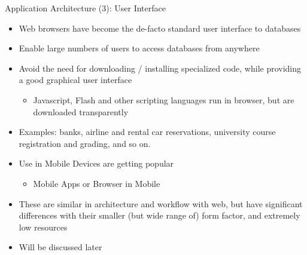 \documentclass[aspectratio=169, xcolor=dvipsnames]{beamer}
\begin{document}
\begin{frame}{Application Architecture (3): User Interface}
    \begin{itemize}[<+->]
        \item Web browsers have become the de-facto standard user interface to databases
        \item Enable large numbers of users to access databases from anywhere
        \item Avoid the need for downloading / installing specialized code, while providing a good graphical user interface
        \begin{itemize}
            \item[$\triangleright$] Javascript, Flash and other scripting languages run in browser, but are downloaded transparently
        \end{itemize}
        \item Examples: banks, airline and rental car reservations, university course registration and grading, and so on.
        \item Use in Mobile Devices are getting popular
        \begin{itemize}
            \item[$\triangleright$] Mobile Apps or Browser in Mobile
        \end{itemize}
        \item These are similar in architecture and workflow with web, but have significant differences with their smaller (but wide range of) form factor, and extremely low resources
        \item Will be discussed later
    \end{itemize}
\end{frame}
\end{document}
